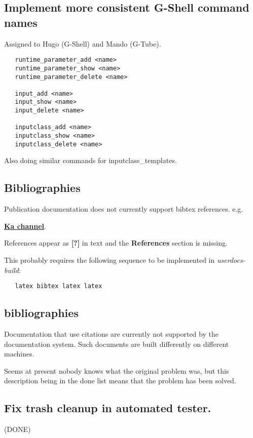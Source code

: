 \documentclass[12pt]{article}
\begin{document}
\subsection{Implement more consistent G-Shell command names}

Assigned to Hugo (G-Shell) and Mando (G-Tube).

\begin{verbatim}
   runtime_parameter_add <name>
   runtime_parameter_show <name>
   runtime_parameter_delete <name>

   input_add <name>
   input_show <name>
   input_delete <name>

   inputclass_add <name>
   inputclass_show <name>
   inputclass_delete <name>
\end{verbatim}

Also doing similar commands for inputclass\_templates.


\subsection{Bibliographies}

Publication documentation does not currently support bibtex references.
e.g.

\href{http://www.genesis-sim.org/userdocs/pub-purkinje-deschutter-ka/pub-purkinje-deschutter-ka.html}{\bf Ka channel}.

References appear as {\bf [?]} in text and the {\bf References} section is missing.

This probably requires the following sequence to be implemented in {\it userdocs-build}:
\begin{verbatim}
   latex bibtex latex latex
\end{verbatim}


\subsection{bibliographies}

Documentation that use citations are currently not supported by the
documentation system.  Such documents are built differently on
different machines.

Seems at present nobody knows what the original problem was, but this
description being in the done list means that the problem has been
solved.


\subsection{Fix trash cleanup in automated tester.} (DONE)
\end{document}
